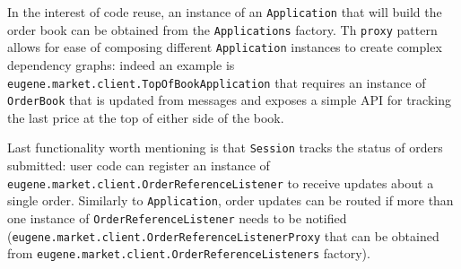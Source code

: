 In the interest of code reuse, an instance of an \texttt{Application} that will build the order book can be obtained from the \texttt{Applications} factory. Th \texttt{proxy} pattern allows for ease of composing different \texttt{Application} instances to create complex dependency graphs: indeed an example is \texttt{eugene.market.client.TopOfBookApplication} that requires an instance of \texttt{OrderBook} that is updated from messages and exposes a simple API for tracking the last price at the top of either side of the book.

Last functionality worth mentioning is that \texttt{Session} tracks the status of orders submitted: user code can register an instance of \\ \texttt{eugene.market.client.OrderReferenceListener} to receive updates about a single order. Similarly to \texttt{Application}, order updates can be routed if more than one instance of \texttt{OrderReferenceListener} needs to be notified \\ (\texttt{eugene.market.client.OrderReferenceListenerProxy} that can be obtained from \texttt{eugene.market.client.OrderReferenceListeners} factory).